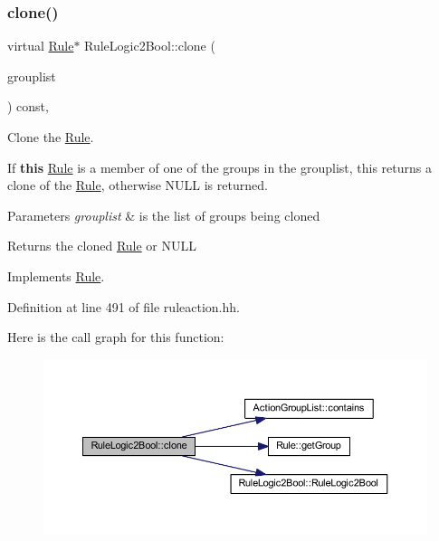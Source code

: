 \subsubsection{\texorpdfstring{clone()}{clone()}}
{\footnotesize\ttfamily virtual \mbox{\hyperlink{class_rule}{Rule}}$\ast$ Rule\+Logic2\+Bool\+::clone (\begin{DoxyParamCaption}\item[{const \mbox{\hyperlink{class_action_group_list}{Action\+Group\+List}} \&}]{grouplist }\end{DoxyParamCaption}) const\hspace{0.3cm}{\ttfamily [inline]}, {\ttfamily [virtual]}}



Clone the \mbox{\hyperlink{class_rule}{Rule}}. 

If {\bfseries{this}} \mbox{\hyperlink{class_rule}{Rule}} is a member of one of the groups in the grouplist, this returns a clone of the \mbox{\hyperlink{class_rule}{Rule}}, otherwise N\+U\+LL is returned. 
\begin{DoxyParams}{Parameters}
{\em grouplist} & is the list of groups being cloned \\
\hline
\end{DoxyParams}
\begin{DoxyReturn}{Returns}
the cloned \mbox{\hyperlink{class_rule}{Rule}} or N\+U\+LL 
\end{DoxyReturn}


Implements \mbox{\hyperlink{class_rule_a70de90a76461bfa7ea0b575ce3c11e4d}{Rule}}.



Definition at line 491 of file ruleaction.\+hh.

Here is the call graph for this function\+:
\nopagebreak
\begin{figure}[H]
\begin{center}
\leavevmode
\includegraphics[width=350pt]{class_rule_logic2_bool_af9afc3c788caa59905c4a79a77c3b06d_cgraph}
\end{center}
\end{figure}
\mbox{\label{class_rule_logic2_bool_a9058e18528bd8d56f16814b18f0bd099}} 
